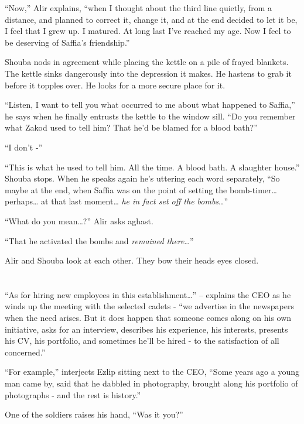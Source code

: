 \documentclass[twoside,11pt]{book}
\begin{document}
``Now,'' Alir explains, ``when I thought about the third line quietly, from a
distance, and planned to correct it, change it, and at the end decided to let it be, I feel that I grew up. I matured.
At long last I've reached my age. Now I feel to be deserving of Saffia's friendship.''

Shouba nods in agreement while placing the kettle on a pile of frayed blankets. The kettle sinks dangerously into the
depression it makes. He hastens to grab it before it topples over. He looks for a more secure place for it.

``Listen, I want to tell you what occurred to me about what happened to Saffia,'' he says when
he finally entrusts the kettle to the window sill. ``Do you remember what Zakod used to tell him? That
he'd be blamed for a blood bath?''

``I don't -''

``This is what he used to tell him. All the time. A blood bath. A slaughter house.'' Shouba
stops. When he speaks again he's uttering each word separately, ``So maybe at the end, when Saffia was on
the point of setting the bomb-timer{\dots} perhaps{\dots} at that last moment{\dots} \textit{he in fact set off the
bombs}{\dots}''

``What do you mean{\ldots}?'' Alir asks aghast.

``That he activated the bombs and \textit{remained there}{\dots}''

Alir and Shouba look at each other. They bow their heads eyes closed.


\bigskip

\chapter{}

``As for hiring new employees in this establishment{\dots}'' -- explains the CEO as he winds up the
meeting with the selected cadets - ``we advertise in the newspapers when the need arises. But it does happen that
someone comes along on his own initiative, asks for an interview, describes his experience, his interests, presents his
CV, his portfolio, and sometimes he'll be hired - to the satisfaction of all concerned.''

``For example,'' interjects Ezlip sitting next to the CEO, ``Some years ago a
young man came by, said that he dabbled in photography, brought along his portfolio of photographs - and the rest is
history.''

One of the soldiers raises his hand, ``Was it you?''
\end{document}
